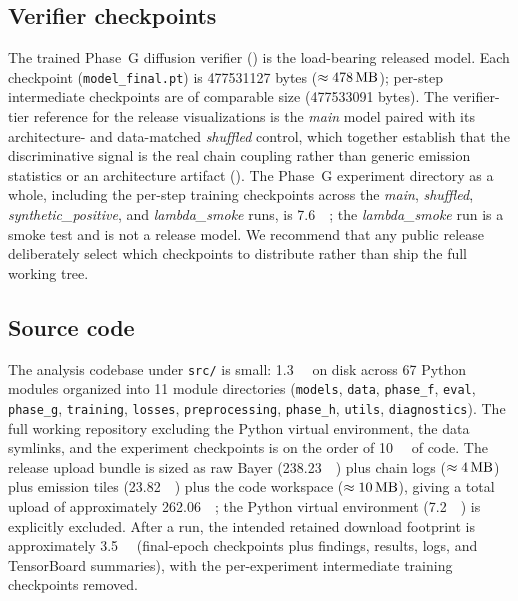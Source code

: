 \subsection{Verifier checkpoints}
\label{sec:availability:checkpoints}

The trained Phase~G diffusion verifier () is the load-bearing released model. Each checkpoint (\texttt{model\_final.pt}) is \num{477531127} bytes ($\approx \SI{478}{\mega\byte}$); per-step intermediate checkpoints are of comparable size (\num{477533091} bytes). The verifier-tier reference for the release visualizations is the \emph{main} model paired with its architecture- and data-matched \emph{shuffled} control, which together establish that the discriminative signal is the real chain coupling rather than generic emission statistics or an architecture artifact (). The Phase~G experiment directory as a whole, including the per-step training checkpoints across the \emph{main}, \emph{shuffled}, \emph{synthetic\_positive}, and \emph{lambda\_smoke} runs, is \SI{7.6}{\giga\byte}; the \emph{lambda\_smoke} run is a smoke test and is not a release model. We recommend that any public release deliberately select which checkpoints to distribute rather than ship the full working tree.

\subsection{Source code}
\label{sec:availability:code}

The analysis codebase under \texttt{src/} is small: \SI{1.3}{\mega\byte} on disk across 67 Python modules organized into 11 module directories (\texttt{models}, \texttt{data}, \texttt{phase\_f}, \texttt{eval}, \texttt{phase\_g}, \texttt{training}, \texttt{losses}, \texttt{preprocessing}, \texttt{phase\_h}, \texttt{utils}, \texttt{diagnostics}). The full working repository excluding the Python virtual environment, the data symlinks, and the experiment checkpoints is on the order of \SI{10}{\mega\byte} of code. The release upload bundle is sized as raw Bayer (\SI{238.23}{\giga\byte}) plus chain logs ($\approx \SI{4}{\mega\byte}$) plus emission tiles (\SI{23.82}{\giga\byte}) plus the code workspace ($\approx \SI{10}{\mega\byte}$), giving a total upload of approximately \SI{262.06}{\giga\byte}; the Python virtual environment (\SI{7.2}{\giga\byte}) is explicitly excluded. After a run, the intended retained download footprint is approximately \SI{3.5}{\giga\byte} (final-epoch checkpoints plus findings, results, logs, and TensorBoard summaries), with the per-experiment intermediate training checkpoints removed.

